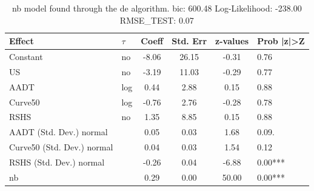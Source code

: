 \begin{table}
	\caption{nb model found through the de algorithm. bic: 600.48 Log-Likelihood: -238.00 RMSE_TEST: 0.07}
	\begin{center}
		\begin{tabular}{|l|l|c|c|c|l|}
			\hline
			Effect & $\tau$ & Coeff & Std. Err & z-values & Prob |z|>Z \\
			\hline
			Constant & no & -8.06 & 26.15 & -0.31 & 0.76 \\
			\hline
			US & no & -3.19 & 11.03 & -0.29 & 0.77 \\
			\hline
			AADT & log & 0.44 & 2.88 & 0.15 & 0.88 \\
			\hline
			Curve50 & log & -0.76 & 2.76 & -0.28 & 0.78 \\
			\hline
			RSHS & no & 1.35 & 8.85 & 0.15 & 0.88 \\
			\hline
			AADT (Std. Dev.) normal &  & 0.05 & 0.03 & 1.68 & 0.09. \\
			\hline
			Curve50 (Std. Dev.) normal &  & 0.04 & 0.03 & 1.54 & 0.12 \\
			\hline
			RSHS (Std. Dev.) normal &  & -0.26 & 0.04 & -6.88 & 0.00*** \\
			\hline
			nb &  & 0.29 & 0.00 & 50.00 & 0.00*** \\
			\hline
		\end{tabular}
	\end{center}
\end{table}